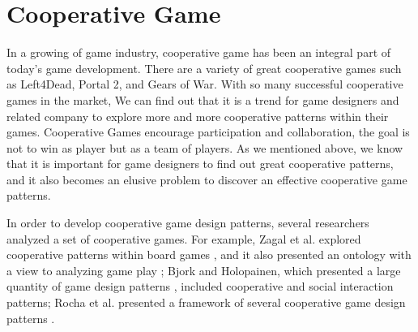 \section{Cooperative Game}


In a growing of game industry, cooperative game has been an integral part of today's game development. There are a variety of great cooperative games such as Left4Dead, Portal 2, and Gears of War. With so many successful cooperative games in the market, We can find out that it is a trend for game designers and related company to explore more and more cooperative patterns within their games. Cooperative Games encourage participation and collaboration, the goal is not to win as player but as a team of players. As we mentioned above, we know that it  is important for game designers to find out great cooperative patterns, and it also becomes an elusive problem to discover an effective cooperative game patterns.


In order to develop cooperative game design patterns, several researchers analyzed a set of cooperative games. For example, Zagal et al. explored cooperative patterns within board games \cite{CG1}, and it also presented an ontology with a view to analyzing game play \cite{CG3}; Bjork and Holopainen, which presented a large quantity of game design patterns \cite{CG2}, included cooperative and social interaction patterns; Rocha et al. presented a framework of several cooperative game design patterns \cite{CG4}.


